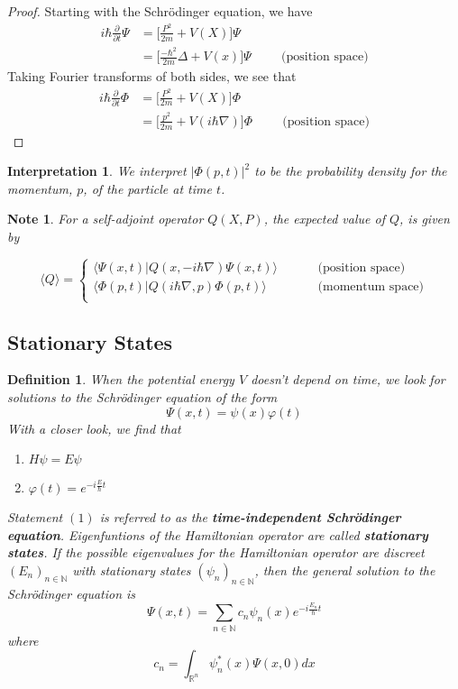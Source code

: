 \documentclass[12pt]{amsart}
\newtheorem{defn}[thm]{Definition}
\newtheorem{intp}[thm]{Interpretation}
\newtheorem{note}[thm]{Note}
\renewcommand{\r}{\rangle}
\renewcommand{\l}{\langle}
\newcommand{\sch}{Schr\"{o}dinger }
\newcommand{\Del}{\Delta}
\newcommand{\N}{\mathbb{N}}
\newcommand{\R}{\mathbb{R}}
\newcommand{\p}[1]{\frac{\partial}{\partial{#1}}}
\begin{document}
\begin{proof}
Starting with the Schr\"{o}dinger equation, we have 
\begin{align*}
i\hbar \p{t} \Psi 
&= \bigg[\frac{P^2}{2m} + V(X)\bigg] \Psi\\
&= \bigg[\frac{-\hbar^2}{2m}\Del + V(x)\bigg] \Psi \hspace{1cm} \text{(position space)}
\end{align*} 
Taking Fourier transforms of both sides, we see that 
\begin{align*}
i\hbar \p{t} \Phi 
&= \bigg[\frac{P^2}{2m} + V(X)\bigg] \Phi\\
&= \bigg[\frac{p^2}{2m} + V(i \hbar \nabla)\bigg] \Phi \hspace{1cm} \text{(position space)}
\end{align*} 
\end{proof}

\begin{intp}
We interpret $\vert \Phi (p,t) \vert^2$ to be the probability density for the momentum, $p$, of the particle at time $t$.  
\end{intp}

\begin{note}
For a self-adjoint operator $Q(X,P)$, the expected value of $Q$,  is given by 

\[ 
\l Q \r = 
\begin{cases}
\l \Psi(x,t) \vert Q(x, -i\hbar \nabla) \Psi(x,t)\r & \hspace{1cm} \text{(position space)}\\
\l \Phi(p,t) \vert Q(i\hbar \nabla, p) \Phi(p,t) \r & \hspace{1cm} \text{(momentum space)}\\
\end{cases}
\]
\end{note}

\subsection{Stationary States}
\begin{defn}
When the potential energy $V$ doesn't depend on time, we look for solutions to the \sch equation of the form $$\Psi(x,t) = \psi(x) \varphi(t)$$ With a closer look, we find that

\begin{enumerate}
\item $H\psi = E \psi$
\item $\varphi(t) = e^{-i\frac{E}{\hbar}t}$
\end{enumerate}
Statement $(1)$ is referred to as the \textbf{time-independent \sch equation}. Eigenfuntions of the Hamiltonian operator are called \textbf{stationary states}. If the possible eigenvalues for the Hamiltonian operator are discreet $(E_n)_{n\in \N}$ with stationary states $(\psi_n)_{n \in \N}$, then the general solution to the \sch equation is $$\Psi(x,t) = \sum_{n \in \N} c_n \psi_n(x) e^{-i\frac{E_n}{\hbar}t}$$ where $$c_n = \int_{\R^n}\psi_n^*(x) \Psi(x,0)dx$$
\end{defn}
\end{document}
